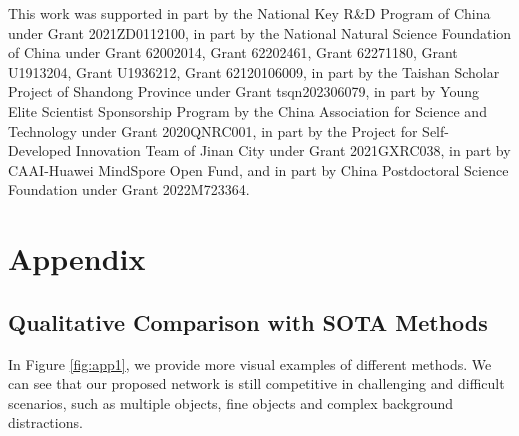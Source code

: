 \documentclass[sigconf,screen]{acmart}
\begin{document}
\begin{acks}
This work was supported in part by the National Key R\&D Program of China under Grant 2021ZD0112100, in part by the National Natural Science Foundation of China under Grant 62002014, Grant 62202461, Grant 62271180, Grant U1913204, Grant U1936212, Grant 62120106009, in part by the Taishan Scholar Project of Shandong Province under Grant tsqn202306079, in part by Young Elite Scientist Sponsorship Program by the China Association for Science and Technology under Grant 2020QNRC001, in part by the Project for Self-Developed Innovation Team of Jinan City under Grant 2021GXRC038, in part by CAAI-Huawei MindSpore Open Fund, and in part by China Postdoctoral Science Foundation under Grant 2022M723364. 


\end{acks}


\clearpage


% 


\newpage
\appendix
\section{Appendix}
\subsection{Qualitative Comparison with SOTA Methods}
In Figure \ref{fig:app1}, we provide more visual examples of different methods. We can see that our proposed network is still competitive in challenging and difficult scenarios, such as multiple objects, fine objects and complex background distractions.
\end{document}

